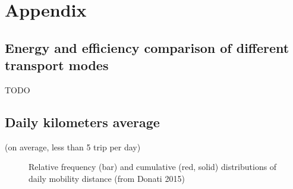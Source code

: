 \section{Appendix}

\subsection{Energy and efficiency comparison of different transport modes} \label{subsec:appendix_enegy_efficiency_comparison}

TODO




\subsection{Daily kilometers average}
(on average, less than 5 trip per day)
\begin{figure}[h!]
    \centering
    \hfill
    \caption{Relative frequency (bar) and cumulative (red, solid) distributions of daily mobility distance (from Donati 2015\cite{donati_individual_2015})}
    \label{fig:daily-lenght-travel}
\end{figure}
